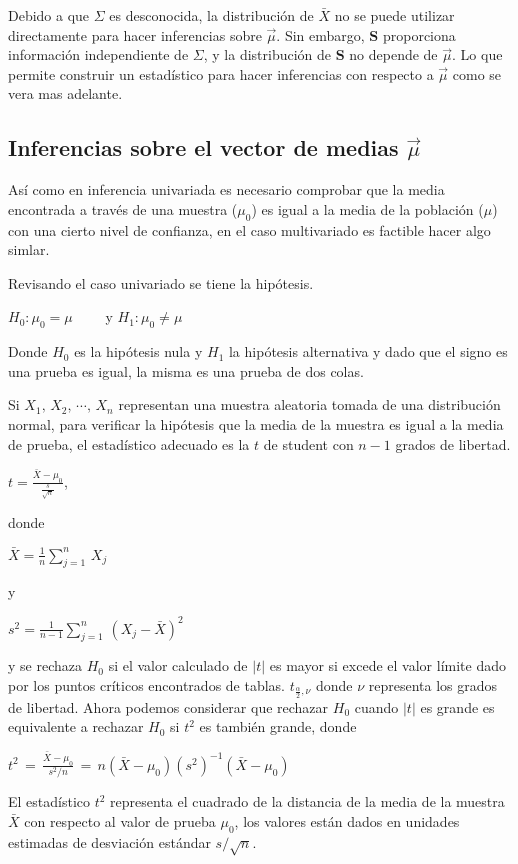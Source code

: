 \documentclass[spanish]{report}
\begin{document}
Debido a que $\Sigma$ es desconocida, la distribución de $\bar{X}$ no se puede utilizar directamente para hacer inferencias sobre $\vec{\mu}$. Sin embargo, $\textbf{S}$ proporciona información independiente de $\Sigma$, y la distribución de $\textbf{S}$ no depende de $\vec{\mu}$. Lo que permite construir un estadístico para hacer inferencias con respecto a $\vec{\mu}$ como se vera mas adelante.

\subsection{Inferencias sobre el vector de medias $\vec{\mu}$}
Así como en inferencia univariada es necesario comprobar que la media encontrada a través de una muestra ($\mu_0$) es igual a la media de la población ($\mu$) con una cierto nivel de confianza, en el caso multivariado es factible hacer algo simlar.

Revisando el caso univariado se tiene la hipótesis.
 

$H_0:\mu_0 = \mu \qquad$ y $H_1:\mu_0 \neq \mu$

Donde $H_0$ es la hipótesis nula y $H_1$ la hipótesis alternativa y dado que el signo es una prueba es igual, la misma es una prueba de dos colas.

Si $X_1,\,X_2,\,\cdots,\,X_n$ representan una muestra aleatoria tomada de una distribución normal, para verificar la hipótesis que la media de la muestra es igual a la media de prueba, el estadístico adecuado es la $t$ de student con $n-1$ grados de libertad.

$t=\frac{\bar{X}-\mu_0}{\frac{s}{\sqrt{n}}}$, 

donde

$\bar{X}= \frac{1}{n}\sum_{j=1}^n\,X_j$ 

y

$s^2=\frac{1}{n-1}\sum_{j=1}^n\,(X_j-\bar{X})^2$

y se rechaza $H_0$ si el valor calculado de $|t|$ es mayor si excede el valor límite dado por los puntos críticos encontrados de tablas. $t_{\frac{\alpha}{2},\nu}$ donde $\nu$ representa los grados de libertad. 
Ahora podemos considerar que rechazar $H_0$ cuando $|t|$ es grande es equivalente a rechazar $H_0$ si $t^2$ es también grande, donde

$t^2\,=\,\frac{\bar{X}-\mu_0}{s^2/n}\,=\,n(\bar{X}-\mu_0)(s^2)^{-1}(\bar{X}-\mu_0)$  

El estadístico $t^2$ representa el cuadrado de la distancia de la media de la muestra $\bar{X}$ con respecto al valor de prueba $\mu_0$, los valores están dados en unidades estimadas de desviación estándar $s/\sqrt{n}$.
\end{document}
